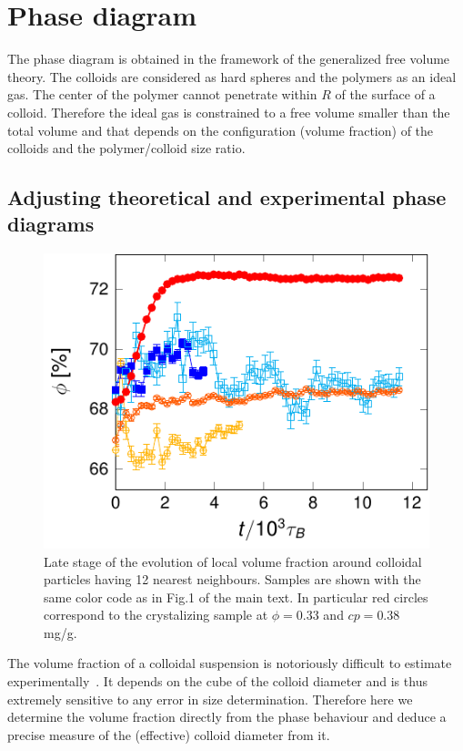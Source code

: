 \section*{Phase diagram}

The phase diagram is obtained in the framework of the generalized free volume theory. The colloids are considered as hard spheres and the polymers as an ideal gas. The center of the polymer cannot penetrate within $R$ of the surface of a colloid. Therefore the ideal gas is constrained to a free volume smaller than the total volume and that depends on the configuration (volume fraction) of the colloids and the polymer/colloid size ratio.

\subsection*{Adjusting theoretical and experimental phase diagrams}

\begin{figure}
\includegraphics{local_phi12.pdf}%
\caption{Late stage of the evolution of local volume fraction around colloidal particles having 12 nearest neighbours. Samples are shown with the same color code as in Fig.1 of the main text. In particular red circles correspond to the crystalizing sample at $\phi=0.33$ and $cp=0.38\,$mg/g.}%
\label{fig:local_phi12}%
\end{figure}

The volume fraction of a colloidal suspension is notoriously difficult to estimate experimentally~\cite{Poon2012}. It depends on the cube of the colloid diameter and is thus extremely sensitive to any error in size determination. Therefore here we determine the volume fraction directly from the phase behaviour and deduce a precise measure of the (effective) colloid diameter from it.

